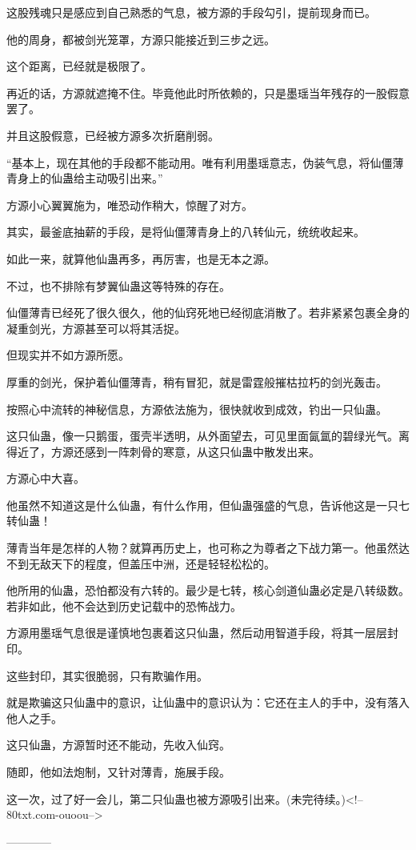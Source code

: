 \begin{this_body}
这股残魂只是感应到自己熟悉的气息，被方源的手段勾引，提前现身而已。

他的周身，都被剑光笼罩，方源只能接近到三步之远。

这个距离，已经就是极限了。

再近的话，方源就遮掩不住。毕竟他此时所依赖的，只是墨瑶当年残存的一股假意罢了。

并且这股假意，已经被方源多次折磨削弱。

“基本上，现在其他的手段都不能动用。唯有利用墨瑶意志，伪装气息，将仙僵薄青身上的仙蛊给主动吸引出来。”

方源小心翼翼施为，唯恐动作稍大，惊醒了对方。

其实，最釜底抽薪的手段，是将仙僵薄青身上的八转仙元，统统收起来。

如此一来，就算他仙蛊再多，再厉害，也是无本之源。

不过，也不排除有梦翼仙蛊这等特殊的存在。

仙僵薄青已经死了很久很久，他的仙窍死地已经彻底消散了。若非紧紧包裹全身的凝重剑光，方源甚至可以将其活捉。

但现实并不如方源所愿。

厚重的剑光，保护着仙僵薄青，稍有冒犯，就是雷霆般摧枯拉朽的剑光轰击。

按照心中流转的神秘信息，方源依法施为，很快就收到成效，钓出一只仙蛊。

这只仙蛊，像一只鹅蛋，蛋壳半透明，从外面望去，可见里面氤氲的碧绿光气。离得近了，方源还感到一阵刺骨的寒意，从这只仙蛊中散发出来。

方源心中大喜。

他虽然不知道这是什么仙蛊，有什么作用，但仙蛊强盛的气息，告诉他这是一只七转仙蛊！

薄青当年是怎样的人物？就算再历史上，也可称之为尊者之下战力第一。他虽然达不到无敌天下的程度，但盖压中洲，还是轻轻松松的。

他所用的仙蛊，恐怕都没有六转的。最少是七转，核心剑道仙蛊必定是八转级数。若非如此，他不会达到历史记载中的恐怖战力。

方源用墨瑶气息很是谨慎地包裹着这只仙蛊，然后动用智道手段，将其一层层封印。

这些封印，其实很脆弱，只有欺骗作用。

就是欺骗这只仙蛊中的意识，让仙蛊中的意识认为：它还在主人的手中，没有落入他人之手。

这只仙蛊，方源暂时还不能动，先收入仙窍。

随即，他如法炮制，又针对薄青，施展手段。

这一次，过了好一会儿，第二只仙蛊也被方源吸引出来。(未完待续。)<!--80txt.com-ouoou-->

------------

\end{this_body}

